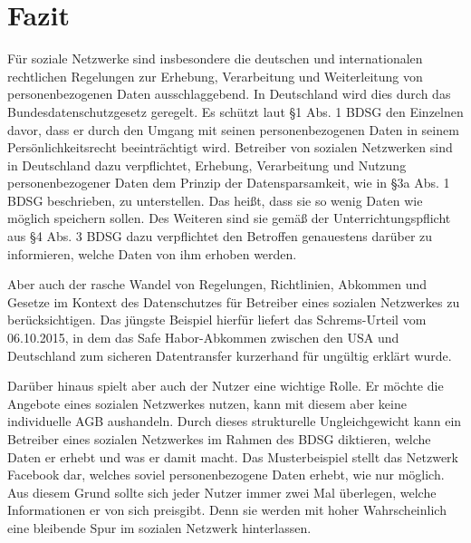 \chapter{Fazit}
Für soziale Netzwerke sind insbesondere die deutschen und internationalen rechtlichen Regelungen zur Erhebung, Verarbeitung und Weiterleitung von personenbezogenen Daten ausschlaggebend. In Deutschland wird dies durch das Bundesdatenschutzgesetz geregelt.  Es schützt laut §1 Abs. 1 BDSG den Einzelnen davor, dass er durch den Umgang mit seinen personenbezogenen Daten in seinem Persönlichkeitsrecht beeinträchtigt wird. Betreiber von sozialen Netzwerken sind in Deutschland dazu verpflichtet, Erhebung, Verarbeitung und Nutzung personenbezogener Daten dem Prinzip der Datensparsamkeit, wie in §3a Abs. 1 BDSG beschrieben, zu unterstellen. Das heißt, dass sie so wenig Daten wie möglich speichern sollen. Des Weiteren sind sie gemäß der Unterrichtungspflicht aus §4 Abs. 3 BDSG dazu verpflichtet den Betroffen genauestens darüber zu informieren, welche Daten von ihm erhoben werden.
\par
Aber auch der rasche Wandel von Regelungen, Richtlinien, Abkommen und Gesetze im Kontext des Datenschutzes für Betreiber eines sozialen Netzwerkes zu berücksichtigen. Das jüngste Beispiel hierfür liefert das Schrems-Urteil vom 06.10.2015, in dem das Safe Habor-Abkommen zwischen den USA und Deutschland zum sicheren Datentransfer kurzerhand für ungültig erklärt wurde.
\par
Darüber hinaus spielt aber auch der Nutzer eine wichtige Rolle. Er möchte die Angebote eines sozialen Netzwerkes nutzen, kann mit diesem aber keine individuelle AGB aushandeln. Durch dieses strukturelle Ungleichgewicht kann ein Betreiber eines sozialen Netzwerkes im Rahmen des \ac{BDSG} diktieren, welche Daten er erhebt und was er damit macht. Das Musterbeispiel stellt das Netzwerk Facebook dar, welches soviel personenbezogene Daten erhebt, wie nur möglich. Aus diesem Grund sollte sich jeder Nutzer immer zwei Mal überlegen, welche Informationen er von sich preisgibt. Denn sie werden mit hoher Wahrscheinlich eine bleibende Spur im sozialen Netzwerk hinterlassen.